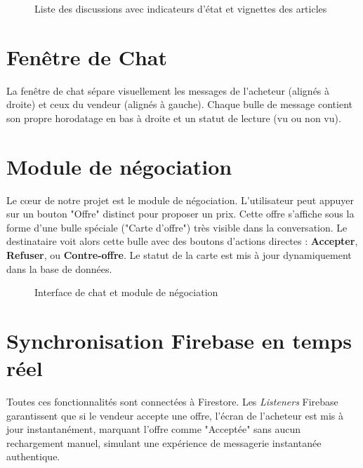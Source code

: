 \documentclass[12pt,a4paper]{report}
\begin{document}
\begin{figure}[h]
    \centering
    \caption{Liste des discussions avec indicateurs d'état et vignettes des articles}
\end{figure}

\section{Fenêtre de Chat}
La fenêtre de chat sépare visuellement les messages de l'acheteur (alignés à droite) et ceux du vendeur (alignés à gauche). Chaque bulle de message contient son propre horodatage en bas à droite et un statut de lecture (vu ou non vu). 

\section{Module de négociation}
Le cœur de notre projet est le module de négociation. 
L'utilisateur peut appuyer sur un bouton "Offre" distinct pour proposer un prix. Cette offre s'affiche sous la forme d'une bulle spéciale ("Carte d'offre") très visible dans la conversation. 
Le destinataire voit alors cette bulle avec des boutons d'actions directes : \textbf{Accepter}, \textbf{Refuser}, ou \textbf{Contre-offre}. Le statut de la carte est mis à jour dynamiquement dans la base de données.

\begin{figure}[h]
    \centering
    \caption{Interface de chat et module de négociation}
\end{figure}

\section{Synchronisation Firebase en temps réel}
Toutes ces fonctionnalités sont connectées à Firestore. Les \textit{Listeners} Firebase garantissent que si le vendeur accepte une offre, l'écran de l'acheteur est mis à jour instantanément, marquant l'offre comme "Acceptée" sans aucun rechargement manuel, simulant une expérience de messagerie instantanée authentique.

\end{document}

